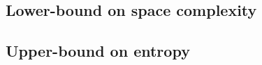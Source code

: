 \documentclass[ ../main.tex]{subfiles}
\begin{document}
%        


\subsection{Lower-bound on space complexity}



\subsection{Upper-bound on entropy}
\end{document}
